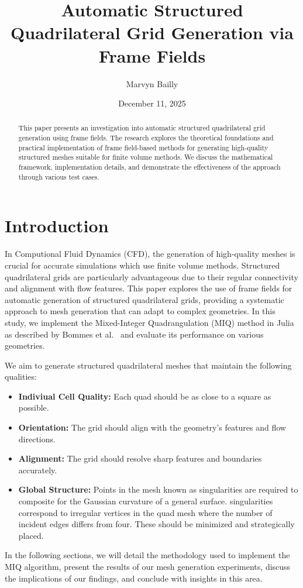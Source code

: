 \documentclass[12pt, letterpaper]{article}
\title{Automatic Structured Quadrilateral Grid Generation via Frame Fields} %
\author{Marvyn Bailly}
\date{December 11, 2025}
\begin{document}
\maketitle
\thispagestyle{empty} %

\begin{abstract}
This paper presents an investigation into automatic structured quadrilateral grid generation using frame fields. The research explores the theoretical foundations and practical implementation of frame field-based methods for generating high-quality structured meshes suitable for finite volume methods. We discuss the mathematical framework, implementation details, and demonstrate the effectiveness of the approach through various test cases.
\end{abstract}

\vspace{0.5in}

\clearpage

\tableofcontents
\clearpage

\section{Introduction}

In Computional Fluid Dynamics (CFD), the generation of high-quality meshes is crucial for accurate simulations which use finite volume methods. Structured quadrilateral grids are particularly advantageous due to their regular connectivity and alignment with flow features. This paper explores the use of frame fields for automatic generation of structured quadrilateral grids, providing a systematic approach to mesh generation that can adapt to complex geometries. In this study, we implement the Mixed-Integer Quadrangulation (MIQ) method in Julia as described by Bommes et al.~\cite{bommes2009mixed} and evaluate its performance on various geometries. 

We aim to generate structured quadrilateral meshes that maintain the following qualities:
\begin{itemize}
    \item \textbf{Indiviual Cell Quality:} Each quad should be as close to a square as possible. 
    \item \textbf{Orientation:} The grid should align with the geometry's features and flow directions.
    \item \textbf{Alignment:} The grid should resolve sharp features and boundaries accurately.
    \item \textbf{Global Structure:} Points in the mesh known as singularities are required to composite for the Gaussian curvature of a general surface. singularities correspond to irregular vertices in the quad mesh where the number of incident edges differs from four. These should be minimized and strategically placed.
\end{itemize}
In the following sections, we will detail the methodology used to implement the MIQ algorithm, present the results of our mesh generation experiments, discuss the implications of our findings, and conclude with insights in this area.
\end{document}
